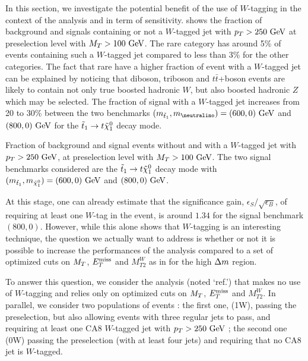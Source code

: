             In this section, we investigate the potential benefit of the use of $W$-tagging
            in the context of the analysis and in term of sensitivity. 
            shows the fraction of background and signals containing or not a $W$-tagged jet
            with $p_T > 250~\text{GeV}$ at preselection level with $M_T > 100~\text{GeV}$. The
            rare category has around 5\% of events containing such a $W$-tagged jet compared
            to less than 3\% for the other categories. The fact that rare have a higher
            fraction of event with a $W$-tagged jet can be explained by noticing that
            diboson, triboson and $t\bar{t}$+boson events are likely to contain not only
            true boosted hadronic $W$, but also boosted hadronic $Z$ which may be selected.
            The fraction of signal with a $W$-tagged jet increases from 20 to 30\% between
            the two benchmarks $(\mass{\lstop},\mass{\neutralino}) = (600,0) \GeV$ and
            $(800,0) ~\text{GeV}$ for the $\tilde{t}_1 \rightarrow t \tilde{\chi}_1^0$ decay mode.

                         {Fraction of background and signal events without and with a
                         $W$-tagged jet with $p_T > 250~\text{GeV}$, at preselection level with
                         $M_T > 100~\text{GeV}$. The two signal benchmarks considered are the $\tilde{t}_1
                         \rightarrow t \tilde{\chi}_1^0$ decay mode with
                         $(m_{\tilde{t}_1},m_{\tilde{\chi}_1^0}) = (600,0)~\text{GeV}$ and $(800,0)~\text{GeV}$.}

            At this stage, one can already estimate that the significance gain, $\epsilon_S / \sqrt{\epsilon_B}$,
            of requiring at least one $W$-tag in the event, is around $1.34$ for the
            signal benchmark $(800,0)$. However, while this alone shows that $W$-tagging
            is an interesting technique, the question we actually want to address is whether or not
            it is possible to increase the performances of the analysis compared to a set
            of optimized cuts on $M_T$, $E_T^\text{miss}$ and $M_{T2}^{W}$ as in
             for the high $\Delta m$ region.

            To answer this question, we consider the analysis (noted `ref.') that makes
            no use of $W$-tagging
            and relies only on optimized cuts on $M_T$, $E_T^\text{miss}$ and $M_{T2}^{W}$. In parallel,
            we consider two populations of events : the first one, (1W), passing the preselection,
            but also allowing events with three regular jets to pass, and requiring at least
            one CA8 $W$-tagged jet with $p_T > 250~\text{GeV}$ ; the second one (0W) passing the
            preselection (with at least four jets) and requiring that no CA8 jet is $W$-tagged.

